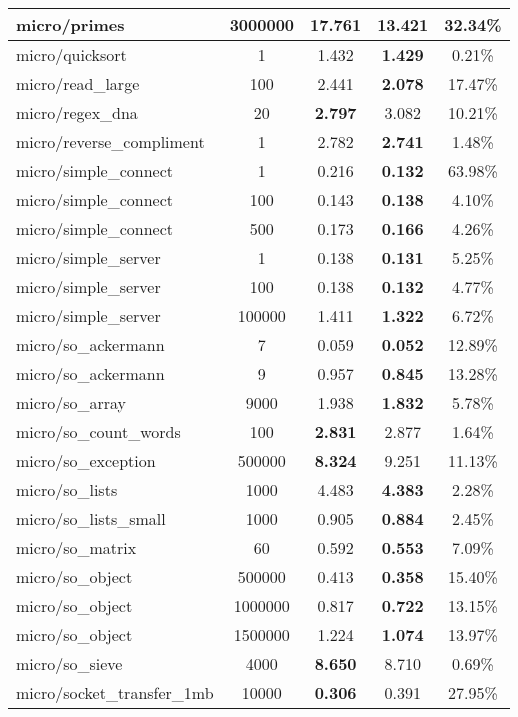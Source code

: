 \begin{center}
\begin{longtable}{l|c|c|c|c}
  micro/primes & 3000000 & 17.761 & \textbf{13.421} & 32.34\% \\ \hline
  micro/quicksort & 1 & 1.432 & \textbf{1.429} & 0.21\% \\ \hline
  micro/read\_large & 100 & 2.441 & \textbf{2.078} & 17.47\% \\ \hline
  micro/regex\_dna & 20 & \textbf{2.797} & 3.082 & 10.21\% \\ \hline
  micro/reverse\_compliment & 1 & 2.782 & \textbf{2.741} & 1.48\% \\ \hline
  micro/simple\_connect & 1 & 0.216 & \textbf{0.132} & 63.98\% \\ \hline
  micro/simple\_connect & 100 & 0.143 & \textbf{0.138} & 4.10\% \\ \hline
  micro/simple\_connect & 500 & 0.173 & \textbf{0.166} & 4.26\% \\ \hline
  micro/simple\_server & 1 & 0.138 & \textbf{0.131} & 5.25\% \\ \hline
  micro/simple\_server & 100 & 0.138 & \textbf{0.132} & 4.77\% \\ \hline
  micro/simple\_server & 100000 & 1.411 & \textbf{1.322} & 6.72\% \\ \hline
  micro/so\_ackermann & 7 & 0.059 & \textbf{0.052} & 12.89\% \\ \hline
  micro/so\_ackermann & 9 & 0.957 & \textbf{0.845} & 13.28\% \\ \hline
  micro/so\_array & 9000 & 1.938 & \textbf{1.832} & 5.78\% \\ \hline
  micro/so\_count\_words & 100 & \textbf{2.831} & 2.877 & 1.64\% \\ \hline
  micro/so\_exception & 500000 & \textbf{8.324} & 9.251 & 11.13\% \\ \hline
  micro/so\_lists & 1000 & 4.483 & \textbf{4.383} & 2.28\% \\ \hline
  micro/so\_lists\_small & 1000 & 0.905 & \textbf{0.884} & 2.45\% \\ \hline
  micro/so\_matrix & 60 & 0.592 & \textbf{0.553} & 7.09\% \\ \hline
  micro/so\_object & 500000 & 0.413 & \textbf{0.358} & 15.40\% \\ \hline
  micro/so\_object & 1000000 & 0.817 & \textbf{0.722} & 13.15\% \\ \hline
  micro/so\_object & 1500000 & 1.224 & \textbf{1.074} & 13.97\% \\ \hline
  micro/so\_sieve & 4000 & \textbf{8.650} & 8.710 & 0.69\% \\ \hline
  micro/socket\_transfer\_1mb & 10000 & \textbf{0.306} & 0.391 & 27.95\% \\ \hline

\end{longtable}
\end{center}
